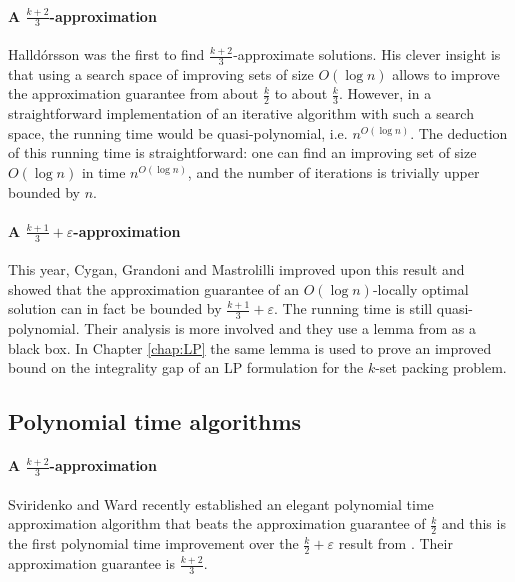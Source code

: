 \paragraph{A $\frac{k+2}{3}$-approximation} Halld\'{o}rsson \cite{Halldorsson} was the first to find $\frac{k+2}{3}$-approximate solutions. His clever insight is that using a search space of improving sets of size $O(\log n)$ allows to improve the approximation guarantee from about $\frac{k}{2}$ to about $\frac{k}{3}$. However, in a straightforward implementation of an iterative algorithm with such a search space, the running time would be quasi-polynomial, i.e. $n^{O(\log n)}$. The deduction of this running time is straightforward: one can find an improving set of size $O(\log n)$ in time $n^{O(\log n)}$, and the number of iterations is trivially upper bounded by $n$.

\paragraph{A $\frac{k+1}{3} + \varepsilon$-approximation} This year, Cygan, Grandoni and Mastrolilli \cite{Mastrolilli} improved upon this result and showed that the approximation guarantee of an $O(\log n)$-locally optimal solution can in fact be bounded by $\frac{k+1}{3} + \varepsilon$. The running time is still quasi-polynomial. Their analysis is more involved and they use a lemma from \cite{BermanMIS} as a black box. In Chapter \ref{chap:LP} the same lemma is used to prove an improved bound on the integrality gap of an LP formulation for the $k$-set packing problem.

\subsection{Polynomial time algorithms}\label{subsec:UnweightedPoly}


\paragraph{A $\frac{k+2}{3}$-approximation} Sviridenko and Ward \cite{Sviridenko} recently established an elegant polynomial time approximation algorithm that beats the approximation guarantee of $\frac{k}{2}$ and this is the first polynomial time improvement over the $\frac{k}{2} + \varepsilon$ result from \cite{HurkensSchrijver}. Their approximation guarantee is $\frac{k+2}{3}$.


